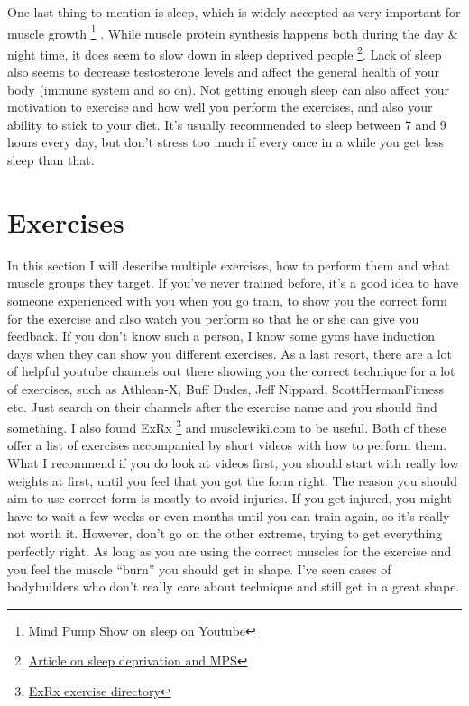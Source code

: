 \documentclass[openany, 12pt]{book}
\begin{document}
        One last thing to mention is sleep, which is widely accepted as very important for muscle growth
        \footnote{\href{https://www.youtube.com/watch?v=13y7P8I8rWo}{Mind Pump Show on sleep on Youtube}}
        . While muscle protein synthesis happens both during the day \& night time,
        it does seem to slow down in sleep deprived people
        \footnote{\href{https://www.ncbi.nlm.nih.gov/pmc/articles/PMC7785053/}{Article on sleep deprivation and MPS}}. Lack of sleep also seems to decrease testosterone levels and affect
        the general health of your body (immune system and so on). Not getting enough sleep can also affect your motivation to exercise and how well you perform the exercises,
        and also your ability to stick to your diet. It's usually recommended to sleep between 7 and 9 hours every day, but don't stress too much if every once in a while you get less sleep than that.

        \section{Exercises}

        In this section I will describe multiple exercises, how to perform them and what muscle groups they target.
        If you've never trained before, it's a good idea to have someone experienced with you when you go train, to show you the correct form for the exercise
        and also watch you perform so that he or she can give you feedback. If you don't know such a person, I know some gyms have induction days when they can show you
        different exercises. As a last resort, there are a lot of helpful youtube channels out there showing you the correct technique for a lot of exercises, such as
        Athlean-X, Buff Dudes, Jeff Nippard, ScottHermanFitness etc. Just search on their channels after the exercise name and you should find something.
        I also found ExRx
        \footnote{\href{https://exrx.net/Lists/Directory}{ExRx exercise directory}} and 
        musclewiki.com to be useful. Both of these offer a list of exercises accompanied by short videos with how to perform them.
        What I recommend if you do look at videos first, you should start with really low weights at first, until you feel that you got the form right.
        The reason you should aim to use correct form is mostly to avoid injuries. If you get injured, you might have to wait a few weeks or even months until
        you can train again, so it's really not worth it. However, don't go on the other extreme, trying to get everything perfectly right. As long as you are
        using the correct muscles for the exercise and you feel the muscle ``burn'' you should get in shape. I've seen cases of bodybuilders who don't really care
        about technique and still get in a great shape.
        
\end{document}
